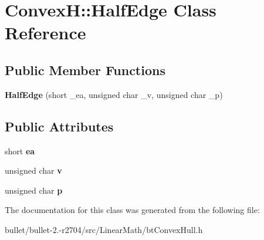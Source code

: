 \hypertarget{class_convex_h_1_1_half_edge}{\section{Convex\+H\+:\+:Half\+Edge Class Reference}
\label{class_convex_h_1_1_half_edge}
}
\subsection*{Public Member Functions}
\begin{DoxyCompactItemize}
\item 
\hypertarget{class_convex_h_1_1_half_edge_ad7ef0d696cc1c6cb56788be356c5cb96}{{\bfseries Half\+Edge} (short \+\_\+ea, unsigned char \+\_\+v, unsigned char \+\_\+p)}\label{class_convex_h_1_1_half_edge_ad7ef0d696cc1c6cb56788be356c5cb96}

\end{DoxyCompactItemize}
\subsection*{Public Attributes}
\begin{DoxyCompactItemize}
\item 
\hypertarget{class_convex_h_1_1_half_edge_a99077196d5796ba411125a3115ec62af}{short {\bfseries ea}}\label{class_convex_h_1_1_half_edge_a99077196d5796ba411125a3115ec62af}

\item 
\hypertarget{class_convex_h_1_1_half_edge_ab0656fb9440f481a10ded66c4c499998}{unsigned char {\bfseries v}}\label{class_convex_h_1_1_half_edge_ab0656fb9440f481a10ded66c4c499998}

\item 
\hypertarget{class_convex_h_1_1_half_edge_a7501507a5ae997454c8c13705c950b4d}{unsigned char {\bfseries p}}\label{class_convex_h_1_1_half_edge_a7501507a5ae997454c8c13705c950b4d}

\end{DoxyCompactItemize}


The documentation for this class was generated from the following file\+:\begin{DoxyCompactItemize}
\item 
bullet/bullet-\/2.-\/r2704/src/\+Linear\+Math/bt\+Convex\+Hull.\+h\end{DoxyCompactItemize}
